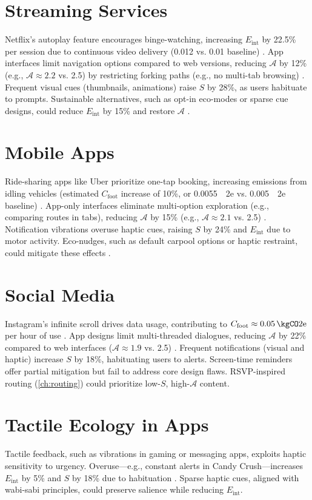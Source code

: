 \documentclass[openany]{book}
\newcommand{\Sent}{S} %
\newcommand{\Eint}{E_{\mathrm{int}}} %
\newcommand{\Cfoot}{C_{\mathrm{foot}}} %
\newcommand{\Auton}{\mathcal{A}} %
\newcommand{\kWh}{\mathrm{kWh}}
\begin{document}
\section{Streaming Services}
\label{sec:cases-streaming}
Netflix’s autoplay feature encourages binge-watching, increasing $\Eint$ by 22.5\% per session due to continuous video delivery (\SI{0.012}{\kWh} vs. \SI{0.01}{\kWh} baseline) \citep{colak2024}. App interfaces limit navigation options compared to web versions, reducing $\Auton$ by 12\% (e.g., $\Auton \approx 2.2$ vs. 2.5) by restricting forking paths (e.g., no multi-tab browsing) \citep{doctorow2022}. Frequent visual cues (thumbnails, animations) raise $\Sent$ by 28\%, as users habituate to prompts. Sustainable alternatives, such as opt-in eco-modes or sparse cue designs, could reduce $\Eint$ by 15\% and restore $\Auton$ \citep{extentia2024}.

\section{Mobile Apps}
\label{sec:cases-apps}
Ride-sharing apps like Uber prioritize one-tap booking, increasing emissions from idling vehicles (estimated $\Cfoot$ increase of 10\%, or \SI{0.0055}{\kgCO2e} vs. \SI{0.005}{\kgCO2e} baseline) \citep{colak2024}. App-only interfaces eliminate multi-option exploration (e.g., comparing routes in tabs), reducing $\Auton$ by 15\% (e.g., $\Auton \approx 2.1$ vs. 2.5) \citep{doctorow2022}. Notification vibrations overuse haptic cues, raising $\Sent$ by 24\% and $\Eint$ due to motor activity. Eco-nudges, such as default carpool options or haptic restraint, could mitigate these effects \citep{colak2024}.

\section{Social Media}
\label{sec:cases-social}
Instagram’s infinite scroll drives data usage, contributing to $\Cfoot \approx \SI{0.05}{\kgCO2e}$ per hour of use \citep{designlab2024}. App designs limit multi-threaded dialogues, reducing $\Auton$ by 22\% compared to web interfaces ($\Auton \approx 1.9$ vs. 2.5) \citep{doctorow2022}. Frequent notifications (visual and haptic) increase $\Sent$ by 18\%, habituating users to alerts. Screen-time reminders offer partial mitigation but fail to address core design flaws. RSVP-inspired routing (\cref{ch:routing}) could prioritize low-$\Sent$, high-$\Auton$ content.

\section{Tactile Ecology in Apps}
\label{sec:cases-tactile}
Tactile feedback, such as vibrations in gaming or messaging apps, exploits haptic sensitivity to urgency. Overuse—e.g., constant alerts in Candy Crush—increases $\Eint$ by 5\% and $\Sent$ by 18\% due to habituation \citep{gallace2006}. Sparse haptic cues, aligned with wabi-sabi principles, could preserve salience while reducing $\Eint$.
\end{document}
